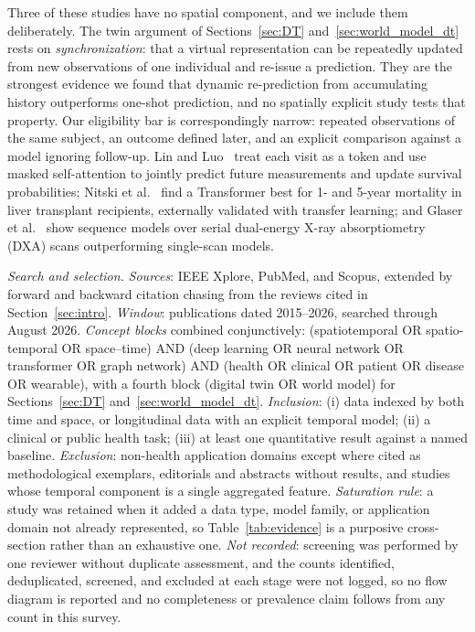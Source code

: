 \documentclass[journal]{IEEEtran}
\begin{document}
Three of these studies have no spatial component, and we include them deliberately. The twin argument of Sections~\ref{sec:DT} and~\ref{sec:world_model_dt} rests on \emph{synchronization}: that a virtual representation can be repeatedly updated from new observations of one individual and re-issue a prediction. They are the strongest evidence we found that dynamic re-prediction from accumulating history outperforms one-shot prediction, and no spatially explicit study tests that property. Our eligibility bar is correspondingly narrow: repeated observations of the same subject, an outcome defined later, and an explicit comparison against a model ignoring follow-up. Lin and Luo~\cite{lin2022deep} treat each visit as a token and use masked self-attention to jointly predict future measurements and update survival probabilities; Nitski et al.~\cite{nitski2021long} find a Transformer best for 1- and 5-year mortality in liver transplant recipients, externally validated with transfer learning; and Glaser et al.~\cite{glaser2022deep} show sequence models over serial dual-energy X-ray absorptiometry (DXA) scans outperforming single-scan models.

\emph{Search and selection.} \emph{Sources}: IEEE Xplore, PubMed, and Scopus, extended by forward and backward citation chasing from the reviews cited in Section~\ref{sec:intro}. \emph{Window}: publications dated 2015--2026, searched through August 2026. \emph{Concept blocks} combined conjunctively: (spatiotemporal OR spatio-temporal OR space--time) AND (deep learning OR neural network OR transformer OR graph network) AND (health OR clinical OR patient OR disease OR wearable), with a fourth block (digital twin OR world model) for Sections~\ref{sec:DT} and~\ref{sec:world_model_dt}. \emph{Inclusion}: (i) data indexed by both time and space, or longitudinal data with an explicit temporal model; (ii) a clinical or public health task; (iii) at least one quantitative result against a named baseline. \emph{Exclusion}: non-health application domains except where cited as methodological exemplars, editorials and abstracts without results, and studies whose temporal component is a single aggregated feature. \emph{Saturation rule}: a study was retained when it added a data type, model family, or application domain not already represented, so Table~\ref{tab:evidence} is a purposive cross-section rather than an exhaustive one. \emph{Not recorded}: screening was performed by one reviewer without duplicate assessment, and the counts identified, deduplicated, screened, and excluded at each stage were not logged, so no flow diagram is reported and no completeness or prevalence claim follows from any count in this survey.
\end{document}
